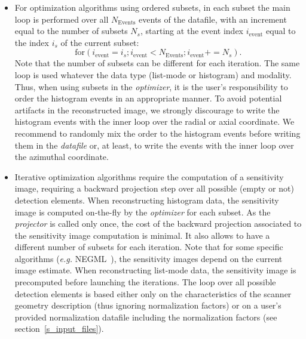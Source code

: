 \documentclass[a4paper, 11pt]{article}
\begin{document}
\begin{itemize}
  \item For optimization algorithms using ordered subsets, in each subset the main loop is performed over all $N_{\mathrm{Events}}$ events of the
        datafile, with an increment equal to the number of subsets $N_s$, starting at the event index $i_{\mathrm{event}}$ equal to the index $i_s$
        of the current subset: \[ {\mathrm{for}}(i_{\mathrm{event}}=i_s;i_{\mathrm{event}}<N_{\mathrm{Events}};i_{\mathrm{event}}+=N_s). \]
        Note that the number of subsets can be different for each iteration. 
        The same loop is used whatever the data type (list-mode or histogram) and modality. 
        Thus, when using subsets in the \textit{optimizer}, it is the user's responsibility to order the histogram events in an appropriate manner. 
        To avoid potential artifacts in the reconstructed image, {\color{red} we strongly discourage to write the histogram events with the inner
        loop over the radial or axial coordinate}. We recommend to randomly mix the order to the histogram events before writing them in the
        \textit{datafile} or, at least, to write the events with the inner loop over the azimuthal coordinate.

  \item Iterative optimization algorithms require the computation of a sensitivity image, requiring a backward projection step over all possible
        (empty or not) detection elements.
        When reconstructing histogram data, the sensitivity image is computed on-the-fly by the \textit{optimizer} for each subset. As the
        \textit{projector} is called only once, the cost of the backward projection associated to the sensitivity image computation is minimal. 
        It also allows to have a different number of subsets for each iteration. 
        Note that for some specific algorithms (\textit{e.g.} NEGML~\cite{NEGML}), the sensitivity images depend on the current image estimate.
        When reconstructing list-mode data, the sensitivity image is precomputed before launching the iterations.
        The loop over all possible detection elements is based either only on the characteristics of the scanner geometry description (thus ignoring
        normalization factors) or on a user's provided normalization datafile including the normalization factors (see section~\ref{s_input_files}).

\end{itemize}

\end{document}
